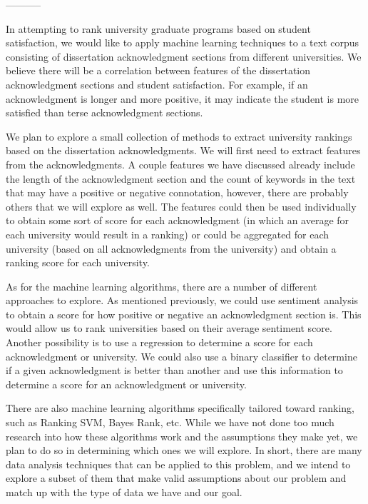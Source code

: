 -----------

In attempting to rank university graduate programs based on student satisfaction, we would like to apply machine learning techniques to a text corpus consisting of dissertation acknowledgment sections from different universities.   We believe there will be a correlation between features of the dissertation acknowledgment sections and student satisfaction.  For example, if an acknowledgment is longer and more positive, it may indicate the student is more satisfied than terse acknowledgment sections.

We plan to explore a small collection of methods to extract university rankings based on the dissertation acknowledgments.  We will first need to extract features from the acknowledgments.  A couple features we have discussed already include the length of the acknowledgment section and the count of keywords in the text that may have a positive or negative connotation, however, there are probably others that we will explore as well.  The features could then be used individually to obtain some sort of score for each acknowledgment (in which an average for each university would result in a ranking) or could be aggregated for each university (based on all acknowledgments from the university) and obtain a ranking score for each university.

As for the machine learning algorithms, there are a number of different approaches to explore.  As mentioned previously, we could use sentiment analysis to obtain a score for how positive or negative an acknowledgment section is.  This would allow us to rank universities based on their average sentiment score.  Another possibility is to use a regression to determine a score for each acknowledgment or university.  We could also use a binary classifier to determine if a given acknowledgment is better than another and use this information to determine a score for an acknowledgment or university.  

There are also machine learning algorithms specifically tailored toward ranking, such as Ranking SVM, Bayes Rank, etc.  While we have not done too much research into how these algorithms work and the assumptions they make yet, we plan to do so in determining which ones we will explore.  In short, there are many data analysis techniques that can be applied to this problem, and we intend to explore a subset of them that make valid assumptions about our problem and match up with the type of data we have and our goal.